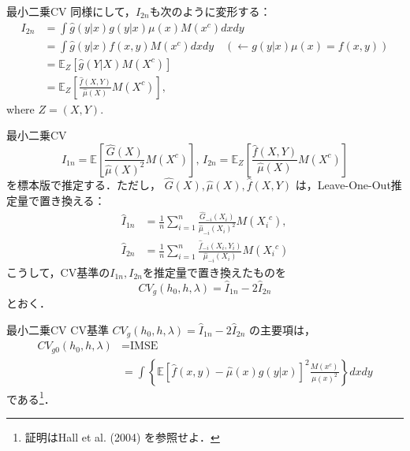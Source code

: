 \documentclass[xcolor=svgnames,dvipdfmx,cjk]{beamer}
\theoremstyle{example}
\begin{document}
\begin{frame}{最小二乗CV}
\quad 同様にして，$I_{2n}$も次のように変形する：
\begin{align*}
  I_{2n} 
      &= \displaystyle \int \hat{g}(y|x) g(y|x)\mu(x)M(x^c)dxdy \\
      &= \displaystyle \int \hat{g}(y|x) f(x,y)M(x^c)dxdy
         \quad (\leftarrow g(y|x)\mu(x)=f(x,y))  \\
      &= \mathbb{E}_{Z}[\hat{g}(Y|X)M(X^c)] \\
      &= \mathbb{E}_{Z}\left[ \frac{\hat{f}(X,Y)}{\hat{\mu}(X)} M(X^c) \right],
\end{align*}
where $Z=(X,Y)$.
\end{frame}

\begin{frame}{最小二乗CV}
\[ 
   I_{1n} = \mathbb{E} \left[\frac{\hat{G}(X)}{\hat{\mu}(X)^2} M(X^c) \right],\,
   I_{2n} = \mathbb{E}_{Z}\left[ \frac{\hat{f}(X,Y)}{\hat{\mu}(X)} M(X^c) \right]
\]
を標本版で推定する．ただし，
$\hat{G}(X), \hat{\mu}(X), \hat{f}(X,Y)$
は，Leave-One-Out推定量で置き換える：
\begin{align*}
  \hat{I}_{1n} 
      &= \frac{1}{n} \sum_{i=1}^{n} 
         \frac{\hat{G}_{-i}(X_i)}{\hat{\mu}_{-i}(X_i)^2} M({X_i}^c), \\
  \hat{I}_{2n}
      &= \frac{1}{n} \sum_{i=1}^{n}
         \frac{\hat{f}_{-i}(X_i,Y_i)}{\hat{\mu}_{-i}(X_i)} M({X_i}^c)
\end{align*}
こうして，CV基準の${I}_{1n}, {I}_{2n}$を推定量で置き換えたものを
\[ 
  CV_g(h_0,h,\lambda) = \hat{I}_{1n} -2\hat{I}_{2n}
\]
とおく．
\end{frame}

\begin{frame}{最小二乗CV}
  \quad 
  CV基準 
  $CV_g(h_0,h,\lambda) = \hat{I}_{1n} -2\hat{I}_{2n}$
  の主要項は，
  \begin{align*}
    CV_{g0}(h_0,h,\lambda) 
      &= \text{IMSE} \\
      &= \int 
      \left\{
        \mathbb{E} [\hat{f}(x,y) - \hat{\mu}(x) g(y|x)]^2 
        \frac{M(x^c)}{\mu(x)^2}
      \right\}
      dxdy   
  \end{align*}
  である\footnote{証明はHall et al. (2004) を参照せよ．}．
 
\end{frame}
\end{document}
